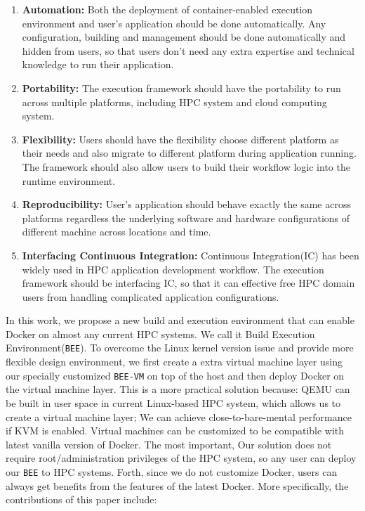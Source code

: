 \begin{enumerate}
\item \textbf{Automation:} 
Both the deployment of container-enabled execution environment and user's application should be done automatically. Any configuration, building and management should be done automatically and hidden from users, so that users don't need any extra expertise and technical knowledge to run their application. 
\item \textbf{Portability:}
The execution framework should have the portability to run across multiple platforms, including HPC system and cloud computing system.
\item \textbf{Flexibility:}
Users should have the flexibility choose different platform as their needs and also migrate to different platform during application running. The framework should also allow users to build their workflow logic into the runtime environment.
\item \textbf{Reproducibility:}
User's application should behave exactly the same across platforms regardless the underlying software and hardware configurations of different machine across locations and time.
\item \textbf{Interfacing Continuous Integration:}
Continuous Integration(IC) has been widely used in HPC application development workflow. The execution framework should be interfacing IC, so that it can effective free HPC domain users from handling complicated application configurations.  
\end{enumerate}

In this work, we propose a new build and execution environment that can enable Docker on almost any current HPC systems. We call it Build Execution Environment(\texttt{BEE}). To overcome the Linux kernel version issue and provide more flexible design environment, we first create a extra virtual machine layer using our specially customized \texttt{BEE-VM} on top of the host and then deploy Docker on the virtual machine layer. This is a more practical solution because: 
QEMU can be built in user space in current Linux-based HPC system,  which allows us to create a virtual machine layer; 
We can achieve close-to-bare-mental performance if KVM is enabled.
Virtual machines can be customized to be compatible with latest vanilla version of Docker.
The most important, Our solution does not require root/administration privileges of the HPC system, so any user can deploy our \texttt{BEE} to HPC systems. Forth, since we do not customize Docker, users can always get benefits from the features of the latest Docker. More specifically, the contributions of this paper include:

